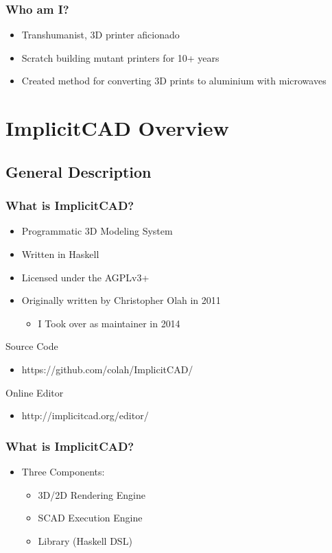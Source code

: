 \documentclass{beamer}
\begin{document}
\begin{frame}
\frametitle{Who am I?}
\begin{itemize}
\item Transhumanist, 3D printer aficionado
\item Scratch building mutant printers for 10+ years
\item Created method for converting 3D prints to aluminium with microwaves
\end{itemize}
\end{frame}


\section{ImplicitCAD Overview}

\subsection{General Description}
\begin{frame}
\frametitle{What is ImplicitCAD?}
\begin{itemize}
\item Programmatic 3D Modeling System
\item Written in Haskell
\item Licensed under the AGPLv3+
\item Originally written by Christopher Olah in 2011
  \begin{itemize}
  \item I Took over as maintainer in 2014
  \end{itemize}
\end{itemize}
\begin{block}{Source Code}
\begin{itemize}
\item https://github.com/colah/ImplicitCAD/
\end{itemize}
\end{block}
\begin{block}{Online Editor}
\begin{itemize}
\item http://implicitcad.org/editor/
\end{itemize}
\end{block}
\end{frame}

\begin{frame}
\frametitle{What is ImplicitCAD?}
\begin{itemize}
\item Three Components:
  \begin{itemize}
  \item 3D/2D Rendering Engine
  \item SCAD Execution Engine
  \item Library (Haskell DSL)
  \end{itemize}
\end{itemize}
\end{frame}
\end{document}
